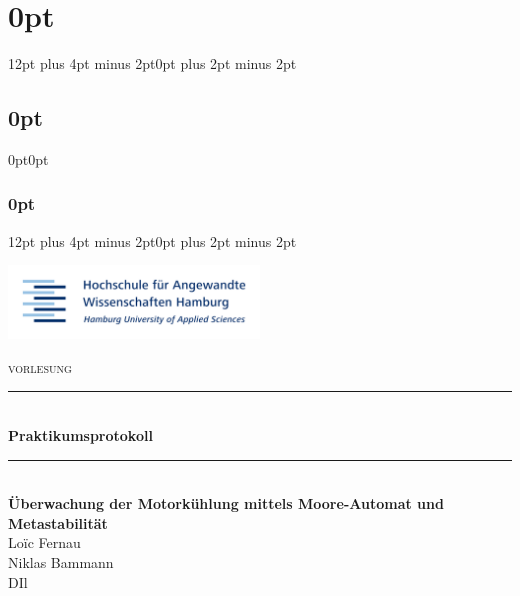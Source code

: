 
\lhead{}
\rhead{}



\usepackage{titlesec}
\titlespacing\section{0pt}{12pt plus 4pt minus 2pt}{0pt plus 2pt minus 2pt}
\titlespacing\subsection{0pt}{0pt}{0pt}
\titlespacing\subsubsection{0pt}{12pt plus 4pt minus 2pt}{0pt plus 2pt minus 2pt}




 	\begin{titlepage}
 		\begin{flushright}
			\includegraphics[width=0.5\textwidth]{img/title.png}\\[2cm]
		\end{flushright}
		
		\begin{center}
			\textsc{\Large vorlesung}
			\rule{\linewidth}{0.5mm}\\[1.5cm]
			{ \huge \bfseries Praktikumsprotokoll}
			\rule{\linewidth}{0.5mm}\\[2cm]
			{ \huge \bfseries Überwachung der Motorkühlung mittels Moore-Automat und Metastabilität}\\[2cm]

			\LARGE Loïc Fernau \\
			\LARGE Niklas Bammann \\[4cm]
			\large DIl
		\end{center}
	\end{titlepage}
	\newpage
	
	\renewcommand{\baselinestretch}{0.8}\normalsize
	\tableofcontents
	\listoffigures
	\listoftables
	\renewcommand{\baselinestretch}{1.0}\normalsize
	
	\newpage

	\setlength{\headsep}{0.4em}
	

	
	
	
	


	\newpage



